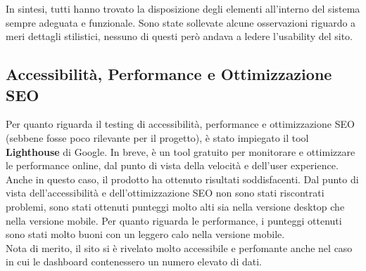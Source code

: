 In sintesi, tutti hanno trovato la disposizione degli elementi all'interno del sistema sempre adeguata e funzionale.
Sono state sollevate alcune osservazioni riguardo a meri dettagli stilistici, nessuno di questi però andava a ledere l'usability del sito.

\subsection*{Accessibilità, Performance e Ottimizzazione SEO}
Per quanto riguarda il testing di accessibilità, performance e ottimizzazione SEO (sebbene fosse poco rilevante per il progetto),
è stato impiegato il tool \textbf{Lighthouse} di Google. In breve, 
è un tool gratuito per monitorare e ottimizzare le performance online, dal punto di vista della velocità e dell'user experience.\\  

Anche in questo caso, il prodotto ha ottenuto risultati soddisfacenti. Dal punto di
vista dell'accessibilità e dell'ottimizzazione SEO non sono stati riscontrati problemi, sono
stati ottenuti punteggi molto alti sia nella versione desktop che nella versione mobile.
Per quanto riguarda le performance, i punteggi ottenuti sono stati molto buoni con 
un leggero calo nella versione mobile.\\

Nota di merito, il sito si è rivelato molto accessibile e perfomante
anche nel caso in cui le dashboard contenessero un numero elevato di dati.\\
